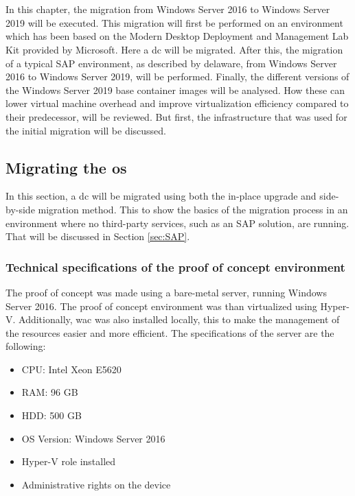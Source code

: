 \chapter{}
\label{ch:methodologie}
In this chapter, the migration from Windows Server 2016 to Windows Server 2019 will be executed. 
This migration will first be performed on an environment which has been based on the Modern Desktop Deployment and Management Lab Kit provided by Microsoft. \autocite{Gallagher2018} 
Here a \acrfull{dc} will be migrated. 
After this, the migration of a typical SAP environment, as described by delaware, from Windows Server 2016 to Windows Server 2019, will be performed. 
Finally, the different versions of the Windows Server 2019 base container images will be analysed. 
How these can lower virtual machine overhead and improve virtualization efficiency compared to their predecessor, will be reviewed. 
But first, the infrastructure that was used for the initial migration will be discussed.

\section{Migrating the \acrshort{os}}
\label{sec:Migrating_the_OS}
In this section, a \acrshort{dc} will be migrated using both the in-place upgrade and side-by-side migration method. 
This to show the basics of the migration process in an environment where no third-party services, such as an SAP solution, are running. 
That will be discussed in Section \ref{sec:SAP}.

\subsection{Technical specifications of the proof of concept environment}
The proof of concept was made using a bare-metal server, running Windows Server 2016. 
The proof of concept environment was than virtualized using Hyper-V. 
Additionally, \acrlong{wac} was also installed locally, this to make the management of the resources easier and more efficient.
The specifications of the server are the following:

\begin{itemize}
	\item CPU: Intel Xeon E5620
	\item RAM: 96 GB 
	\item HDD: 500 GB
	\item OS Version: Windows Server 2016
	\item Hyper-V role installed
	\item Administrative rights on the device
\end{itemize}


